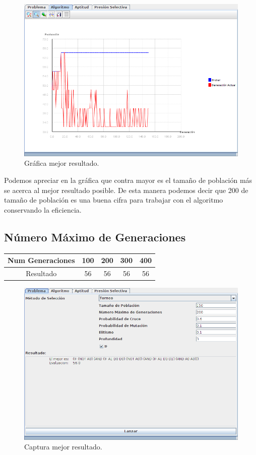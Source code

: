 \documentclass[12pt]{article}
\begin{document}
\begin{figure}[H]
\centering
\includegraphics[scale=0.4]{graficas/tpg64}
\caption{Gráfica mejor resultado.}
\end{figure}

Podemos apreciar en la gráfica que contra mayor es el tamaño de población más se acerca al mejor resultado posible. De esta manera podemos decir que 200 de tamaño de población es una buena cifra para trabajar con el algoritmo conservando la eficiencia. 

	

\subsection{Número Máximo de Generaciones}
\begin{table}[H]
\begin{center}
\begin{tabular}{|ccccc|} \hline
Num Generaciones  & 100 & 200 & 300 & 400 \\  \hline
Resultado  & 56  & 56 & 56 & 56 \\ \hline
\end{tabular}
\end{center}
\end{table}

\begin{figure}[H]
\centering
\includegraphics[scale=0.4]{graficas/nm56}
\caption{Captura mejor resultado.}
\end{figure}
\end{document}
